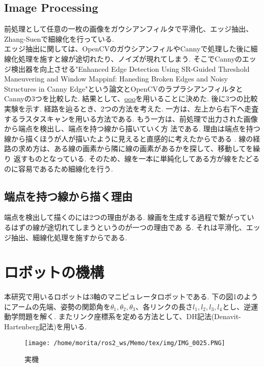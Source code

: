 \documentclass[10pt]{jarticle}
\begin{document}
	\subsection{Image Processing}
	前処理として任意の一枚の画像をガウシアンフィルタで平滑化、エッジ抽出、Zhang-Suenで細線化を行っている.\\
	エッジ抽出に関しては、OpenCVのガウシアンフィルやCannyで処理した後に細線化処理を施すと線が途切れたり、ノイズが現れてしまう.
	そこでCannyのエッジ検出器を向上させる"Enhanced Edge Detection Using SR-Guided Threshold Maneuvering and Window Mappinf: Haneding Broken Edges and Noisy Structures in Canny Edge"という論文とOpenCVのラプラシアンフィルタとCannyの3つを比較した.
	結果として、\underline{ooo}を用いることに決めた.
	後に3つの比較実験を示す.
	経路を辿るとき、2つの方法を考えた.
	一方は、左上から右下へ走査するラスタスキャンを用いる方法である.
	もう一方は、前処理で出力された画像から端点を検出し、端点を持つ線から描いていく方
    法である.
	理由は端点を持つ線から描くほうが人が描いたように見えると直感的に考えたからである
    .
	線の経路の求め方は、ある線の画素から隣に線の画素があるかを探して、移動してを繰り
    返すものとなっている.
	そのため、線を一本に単純化してある方が線をたどるのに容易であるため細線化を行う.
	\subsection{端点を持つ線から描く理由}
	端点を検出して描くのには2つの理由がある.
	線画を生成する過程で繋がっているはずの線が途切れてしまうというのが一つの理由であ
    る.
	それは平滑化、エッジ抽出、細線化処理を施すからである.

 	\section{ロボットの機構}
	本研究で用いるロボットは3軸のマニピュレータロボットである.
	下の図1のようにアームの先端、姿勢の関節角を$\theta_1, \theta_2, \theta_3$、各リンクの長さ$l_1, l_2, l_3, l_4$とし、逆運動学問題を解く.
	またリンク座標系を定める方法として、DH記法(Denavit-Hartenberg記法)を用いる.

    \begin{center}
        \begin{figure}[!b]
            \texttt{[image: /home/morita/ros2\_ws/Memo/tex/img/IMG\_0025.PNG]}
            \caption{実機}
            \label{fig:sample-fig}
        \end{figure}
    \end{center}
    
\end{document}
